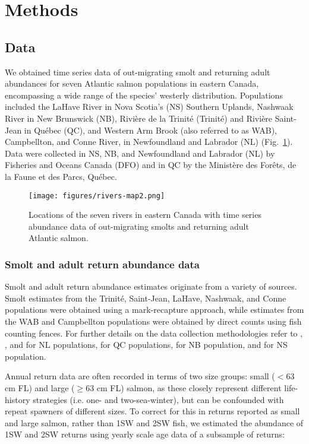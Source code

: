 \documentclass[12pt]{article}
\begin{document}
\section*{Methods}

\subsection*{Data}

We obtained time series data of out-migrating smolt and returning adult
abundances for seven Atlantic salmon populations in eastern Canada, encompassing a
wide range of the species' westerly distribution.
Populations included the LaHave River in Nova Scotia's (NS) Southern Uplands,
Nashwaak River in New Brunswick (NB), Rivi\`{e}re de la Trinit\'{e} (Trinit\'{e}) and
Rivi\`{e}re Saint-Jean in Qu\'{e}bec (QC), and Western Arm Brook (also referred to as WAB),
Campbellton, and Conne River, in Newfoundland and Labrador (NL) (Fig.~\ref{fig:map}).
Data were collected in NS, NB, and Newfoundland
and Labrador (NL) by Fisheries and Oceans Canada (DFO) and in QC
by the Minist\`{e}re des For\^{e}ts, de la Faune et des Parcs, Qu\'{e}bec.

\begin{figure}[htbp]
 \centering
    \texttt{[image: figures/rivers-map2.png]}
    \caption{Locations of the seven rivers in eastern Canada with time series abundance data of out-migrating smolts and
    returning adult Atlantic salmon.} \label{fig:map}

\end{figure}
\subsubsection*{Smolt and adult return abundance data}

Smolt and adult return abundance estimates originate from a variety of
sources. Smolt estimates from the Trinit\'{e}, Saint-Jean, LaHave, Nashwaak,
and Conne populations were obtained using a mark-recapture approach, while
estimates from the WAB and Campbellton populations were obtained by direct
counts using fish counting fences.
For further details on the data collection methodologies refer to
\citet{Dempson1991}, \citet{Schwarz1994}, and \citet{Venoitt2018} for NL populations,
\citet{April2018}  for QC populations,
\citet{Jones2014} for NB population,
and \citet{Gibson2009} for NS population.

Annual return data are often recorded in terms of two size groups: small ($< 63$ cm
FL) and large ($\geq 63$ cm FL) salmon, as these closely represent different
life-history strategies (i.e. one- and two-sea-winter), but can be confounded with repeat
spawners of different sizes. To correct for this in returns
reported as small and large salmon, rather than 1SW and 2SW fish, we estimated the abundance
of 1SW and 2SW returns using yearly scale age data of a subsample of returns:
\end{document}
